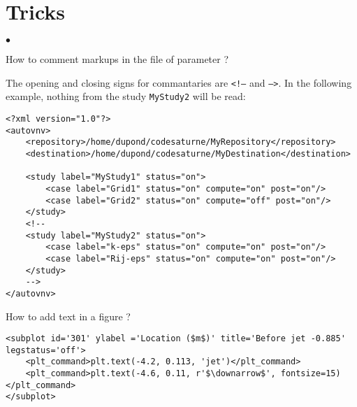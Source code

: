 \documentclass[a4paper,10pt,twoside]{article}
\begin{document}
\section{Tricks}\label{sec:tricks}
\begin{list}{$\bullet$}{}
\item How to comment markups in the file of parameter ?

The opening and closing signs for commantaries are \texttt{<!--} and
\texttt{-->}. In the following example, nothing from the study
\texttt{MyStudy2} will be read:
\begin{verbatim}
<?xml version="1.0"?>
<autovnv>
    <repository>/home/dupond/codesaturne/MyRepository</repository>
    <destination>/home/dupond/codesaturne/MyDestination</destination>

    <study label="MyStudy1" status="on">
        <case label="Grid1" status="on" compute="on" post="on"/>
        <case label="Grid2" status="on" compute="off" post="on"/>
    </study>
    <!--
    <study label="MyStudy2" status="on">
        <case label="k-eps" status="on" compute="on" post="on"/>
        <case label="Rij-eps" status="on" compute="on" post="on"/>
    </study>
    -->
</autovnv>
\end{verbatim}

\item How to add text in a figure ?

\small
\begin{verbatim}
<subplot id='301' ylabel ='Location ($m$)' title='Before jet -0.885' legstatus='off'>
    <plt_command>plt.text(-4.2, 0.113, 'jet')</plt_command>
    <plt_command>plt.text(-4.6, 0.11, r'$\downarrow$', fontsize=15)</plt_command>
</subplot>
 \end{verbatim}
\normalsize

\end{list}


%
\end{document}
